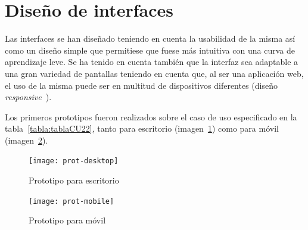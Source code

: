 \section{Diseño de interfaces}

Las interfaces se han diseñado teniendo en cuenta la usabilidad de la misma así como un diseño simple que permitiese que fuese más intuitiva con una curva de aprendizaje leve. Se ha tenido en cuenta también que la interfaz sea adaptable a una gran variedad de pantallas teniendo en cuenta que, al ser una aplicación web, el uso de la misma puede ser en multitud de dispositivos diferentes (diseño \textit{responsive}~\cite{wiki:responsive}).

Los primeros prototipos fueron realizados sobre el caso de uso especificado en la tabla~\ref{tabla:tablaCU22}, tanto para escritorio (imagen~\ref{fig:proto-desk}) como para móvil (imagen~\ref{fig:proto-mob}).

\begin{figure}[h]
	\centering
	\texttt{[image: prot-desktop]}
	\caption{Prototipo para escritorio}
	\label{fig:proto-desk}
\end{figure}

\begin{figure}[h]
	\centering
	\texttt{[image: prot-mobile]}
	\caption{Prototipo para móvil}
	\label{fig:proto-mob}
\end{figure}
